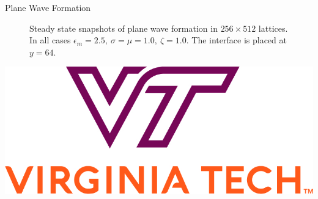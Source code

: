 \documentclass{beamer}
\begin{document}
\begin{frame}{}
\begin{textblock}{0.32}
\begin{block}{Plane Wave Formation}
\begin{figure}[h]
            \caption{\centering Steady state snapshots of plane wave formation in $256 \times 512$ lattices. In all cases $\epsilon_m = 2.5, \ \sigma = \mu = 1.0, \ \zeta = 1.0$. The interface is placed at $y = 64$.}
            \label{fig:plane_waves}
        \end{figure}
    \end{block}
    \hfill
    \begin{center}
        \includegraphics[width=0.25\linewidth]{images/vt_logo.jpg}
    \end{center}
    \hfill
\end{textblock}


\end{frame}
\end{document}
